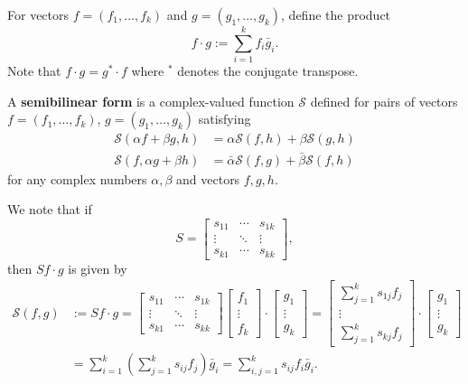 \documentclass[12pt, oneside, a4paper]{article}
\begin{document}
\begin{defn}\cite[p.285]{CoddingtonLevinson}\label{defn:f cdot g}
    For vectors $f=(f_1,\ldots,f_k)$ and $g=(g_1,\ldots,g_k)$, define the product
    \[f\cdot g:=\sum_{i=1}^k f_i\bar{g}_i.\]
    Note that $f\cdot g = g^*\cdot f$ where $^*$ denotes the conjugate transpose.
\end{defn}

\begin{defn}\cite[p.285]{CoddingtonLevinson}\label{defn:semibilinear form}
    A \textbf{semibilinear form} is a complex-valued function $\mathcal{S}$ defined for pairs of vectors $f=(f_1,\ldots,f_k)$, $g=(g_1,\ldots,g_k)$ satisfying
    \begin{align*}
        \mathcal{S}(\alpha f+\beta g, h)&=\alpha\mathcal{S}(f,h) + \beta\mathcal{S}(g,h)\\
        \mathcal{S}(f, \alpha g + \beta h) &= \bar{\alpha}\mathcal{S}(f,g) + \bar{\beta}\mathcal{S}(f, h)
    \end{align*}
    for any complex numbers $\alpha, \beta$ and vectors $f,g,h$.
\end{defn}
We note that if
\[S = \begin{bmatrix}
    s_{11} & \cdots & s_{1k}\\
    \vdots & \ddots & \vdots\\
    s_{k1} & \cdots & s_{kk}
\end{bmatrix},\]
then $Sf\cdot g$ is given by
\begin{equation}\label{eq:semibilinear form}
    \begin{split}
    \mathcal{S}(f,g) &:= Sf\cdot g = \begin{bmatrix}
        s_{11} & \cdots & s_{1k}\\
        \vdots & \ddots & \vdots\\
        s_{k1} & \cdots & s_{kk}
    \end{bmatrix} \begin{bmatrix}
        f_1\\
        \vdots\\
        f_k
    \end{bmatrix} \cdot \begin{bmatrix}
        g_1\\
        \vdots\\
        g_k
    \end{bmatrix} = \begin{bmatrix}
        \sum_{j=1}^k s_{1j}f_j\\
        \vdots\\
        \sum_{j=1}^k s_{kj}f_j
    \end{bmatrix}\cdot \begin{bmatrix}
        g_1\\
        \vdots\\
        g_k
    \end{bmatrix}\\
    &= \sum_{i=1}^k\left(\sum_{j=1}^k s_{ij}f_j\right)\bar{g}_i =\sum_{i,j=1}^k s_{ij}f_i\bar{g}_i.
    \end{split}
\end{equation}
\end{document}
